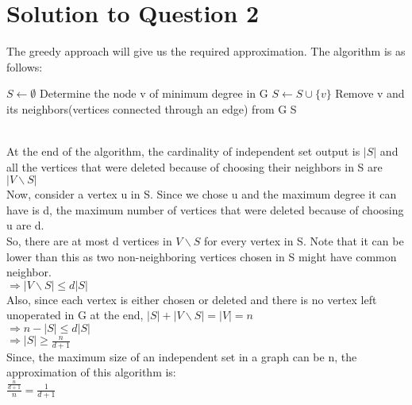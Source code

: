 \documentclass[11pt]{article}
\begin{document}
\section{Solution to Question 2}
The greedy approach will give us the required approximation. The algorithm is as follows:
    \begin{algorithm}
  \begin{algorithmic}
      \State $S \leftarrow \emptyset$
          \State Determine the node v of minimum degree in G
          \State $S \leftarrow S \cup \{v\}$
          \State Remove v and its neighbors(vertices connected through an edge) from G
      \EndWhile
      \State \Return S
    \EndFunction
  \end{algorithmic}
\end{algorithm}\\
At the end of the algorithm, the cardinality of independent set output is $|S|$ and all the vertices that were deleted because of choosing their neighbors in S are $|V \backslash S|$ \\
Now, consider a vertex u in S. Since we chose u and the maximum degree it can have is d, the maximum number of vertices that were deleted because of choosing u are d. \\
So, there are at most d vertices in $V \backslash S$ for every vertex in S. Note that it can be lower than this as two non-neighboring vertices chosen in S might have common neighbor. \\
$\Longrightarrow |V \backslash S| \leq d|S| $ \\
Also, since each vertex is either chosen or deleted and there is no vertex left unoperated in G at the end, $|S| + |V \backslash S| = |V| = n$ \\
$\Longrightarrow n - |S| \leq d|S|$ \\
$\Longrightarrow |S| \geq \frac{n}{d+1}$ \\
Since, the maximum size of an independent set in a graph can be n, the approximation of this algorithm is: \\
$\frac{\frac{n}{d+1}}{n} = \frac{1}{d+1}$
\newpage
\end{document}
